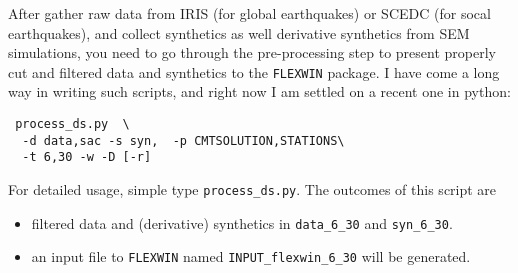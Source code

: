 \documentclass[12pt,titlepage,fleqn]{article}
\begin{document}
After gather raw data from IRIS (for global earthquakes) or SCEDC (for socal earthquakes), and collect synthetics as well derivative synthetics from SEM simulations, you need to go through the pre-processing step to present properly cut and filtered data and synthetics to the \verb=FLEXWIN= package. I have come a long way in writing such scripts, and right now I am settled on a recent one in python:
\begin{verbatim}
 process_ds.py  \
  -d data,sac -s syn,  -p CMTSOLUTION,STATIONS\
  -t 6,30 -w -D [-r]
\end{verbatim}
For detailed usage, simple type \verb+process_ds.py+. The outcomes of this script are
\begin{itemize}
\item filtered data and (derivative) synthetics in \verb+data_6_30+ and \verb+syn_6_30+.
\item an input file to \verb+FLEXWIN+ named \verb+INPUT_flexwin_6_30+ will be generated.
\end{itemize}
\end{document}
